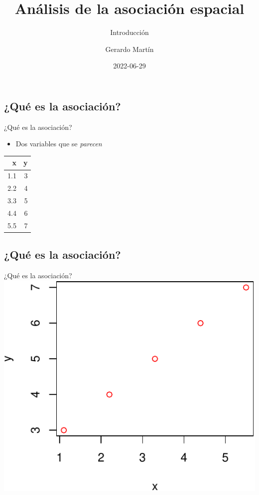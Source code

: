 \documentclass[
  11pt,
  ignorenonframetext,
]{beamer}
\title{Análisis de la asociación espacial}
\subtitle{Introducción}
\author{Gerardo Martín}
\date{2022-06-29}
\providecommand{\tightlist}{%
  \setlength{\itemsep}{0pt}\setlength{\parskip}{0pt}}
\begin{document}
\frame{\titlepage}

\hypertarget{quuxe9-es-la-asociaciuxf3n}{%
\subsection{¿Qué es la asociación?}\label{quuxe9-es-la-asociaciuxf3n}}

\begin{frame}{¿Qué es la asociación?}
\begin{itemize}
\tightlist
\item
  Dos variables que se \emph{parecen}
\end{itemize}

\begin{longtable}[]{@{}rr@{}}
\toprule()
x & y \\
\midrule()
\endhead
1.1 & 3 \\
2.2 & 4 \\
3.3 & 5 \\
4.4 & 6 \\
5.5 & 7 \\
\bottomrule()
\end{longtable}
\end{frame}

\hypertarget{quuxe9-es-la-asociaciuxf3n-1}{%
\subsection{¿Qué es la asociación?}\label{quuxe9-es-la-asociaciuxf3n-1}}

\begin{frame}{¿Qué es la asociación?}
\includegraphics{Intro-asociacion_files/figure-beamer/unnamed-chunk-2-1.pdf}
\end{frame}
\end{document}
